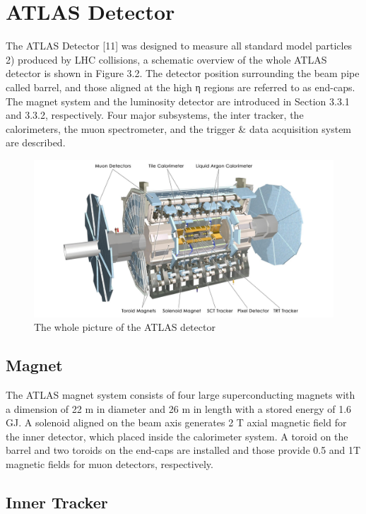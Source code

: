 \section{ATLAS Detector}
The ATLAS Detector [11] was designed to measure all standard model particles 2) produced by LHC collisions, a schematic overview of the whole ATLAS detector is shown in Figure 3.2. The detector position surrounding the beam pipe called barrel, and those aligned at the high η regions are referred to as end-caps.
The magnet system and the luminosity detector are introduced in Section 3.3.1 and 3.3.2, respectively. Four major subsystems, the inter tracker, the calorimeters, the muon spectrometer, and the trigger & data acquisition system are described.
\begin{figure}[tbp]
\begin{center}
 \includegraphics[width=1.0\textwidth,keepaspectratio]{figures/detector/ATLAS}
\caption{
The whole picture of the ATLAS detector
}
\label{fig:CERN}
\end{center}
\end{figure}

\subsection{Magnet}
The ATLAS magnet system consists of four large superconducting magnets with a dimension of 22 m in diameter and 26 m in length with a stored energy of 1.6 GJ. A solenoid aligned on the beam axis generates 2 T axial magnetic field for the inner detector, which placed inside the calorimeter system. A toroid on the barrel and two toroids on the end-caps are installed and those provide 0.5 and 1T magnetic fields for muon detectors, respectively.
\subsection{Inner Tracker}
